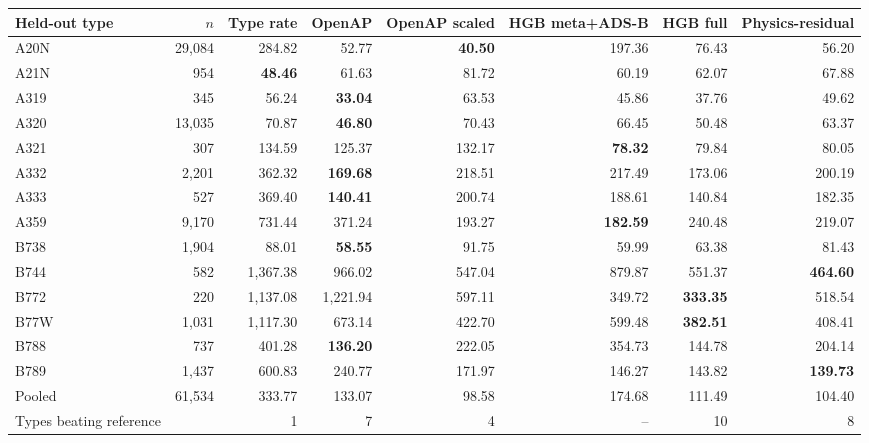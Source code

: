 \begin{tabular}{lrrrrrrr}
\toprule
Held-out type & $n$ & Type rate & OpenAP & OpenAP scaled & HGB meta+ADS-B & HGB full & Physics-residual \\
\midrule
A20N & 29,084 & 284.82 & 52.77 & \textbf{40.50} & 197.36 & 76.43 & 56.20 \\
A21N & 954 & \textbf{48.46} & 61.63 & 81.72 & 60.19 & 62.07 & 67.88 \\
A319 & 345 & 56.24 & \textbf{33.04} & 63.53 & 45.86 & 37.76 & 49.62 \\
A320 & 13,035 & 70.87 & \textbf{46.80} & 70.43 & 66.45 & 50.48 & 63.37 \\
A321 & 307 & 134.59 & 125.37 & 132.17 & \textbf{78.32} & 79.84 & 80.05 \\
A332 & 2,201 & 362.32 & \textbf{169.68} & 218.51 & 217.49 & 173.06 & 200.19 \\
A333 & 527 & 369.40 & \textbf{140.41} & 200.74 & 188.61 & 140.84 & 182.35 \\
A359 & 9,170 & 731.44 & 371.24 & 193.27 & \textbf{182.59} & 240.48 & 219.07 \\
B738 & 1,904 & 88.01 & \textbf{58.55} & 91.75 & 59.99 & 63.38 & 81.43 \\
B744 & 582 & 1,367.38 & 966.02 & 547.04 & 879.87 & 551.37 & \textbf{464.60} \\
B772 & 220 & 1,137.08 & 1,221.94 & 597.11 & 349.72 & \textbf{333.35} & 518.54 \\
B77W & 1,031 & 1,117.30 & 673.14 & 422.70 & 599.48 & \textbf{382.51} & 408.41 \\
B788 & 737 & 401.28 & \textbf{136.20} & 222.05 & 354.73 & 144.78 & 204.14 \\
B789 & 1,437 & 600.83 & 240.77 & 171.97 & 146.27 & 143.82 & \textbf{139.73} \\
\midrule
Pooled & 61,534 & 333.77 & 133.07 & 98.58 & 174.68 & 111.49 & 104.40 \\
Types beating reference & & 1 & 7 & 4 & -- & 10 & 8 \\
\bottomrule
\end{tabular}
